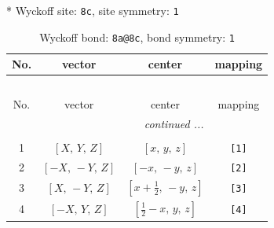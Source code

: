 \documentclass[fleqn,8pt]{jsarticle}
\begin{document}
* Wyckoff site: {\tt 8c}, site symmetry: {\tt 1}
\renewcommand{\arraystretch}{1.2}
\begin{longtable}{cccc}
\caption{Wyckoff bond: {\tt 8a@8c}, bond symmetry: {\tt 1}}
 \\
 \hline \hline
No. & vector & center & mapping \\ \hline \endfirsthead

\multicolumn{3}{l}{\tablename\ \thetable{}} \\
 \hline \hline
No. & vector & center & mapping \\ \hline \endhead

 \hline \hline
\multicolumn{3}{r}{\footnotesize\it continued ...} \\ \endfoot

 \hline \hline
\multicolumn{3}{r}{} \\ \endlastfoot

1 & $\left[ X,\, Y,\, Z \right]$ & $\left[ x,\, y,\, z \right]$ & {\tt [1]} \\ \hline
2 & $\left[ - X,\, - Y,\, Z \right]$ & $\left[ - x,\, - y,\, z \right]$ & {\tt [2]} \\ \hline
3 & $\left[ X,\, - Y,\, Z \right]$ & $\left[ x + \frac{1}{2},\, - y,\, z \right]$ & {\tt [3]} \\ \hline
4 & $\left[ - X,\, Y,\, Z \right]$ & $\left[ \frac{1}{2} - x,\, y,\, z \right]$ & {\tt [4]} \\
\end{longtable}
\end{document}
